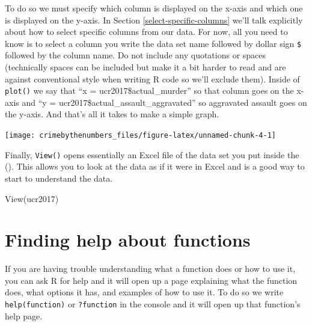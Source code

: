 \documentclass[
  12pt,
]{book}
\newenvironment{Shaded}{\begin{snugshade}}{\end{snugshade}}
\newcommand{\AttributeTok}[1]{\textcolor[rgb]{0.61,0.61,0.61}{#1}}
\newcommand{\FunctionTok}[1]{\textcolor[rgb]{0,0,0}{#1}}
\newcommand{\NormalTok}[1]{#1}
\newcommand{\SpecialCharTok}[1]{\textcolor[rgb]{0,0,0}{#1}}
\begin{document}
To do so we must specify which column is displayed on the x-axis and which one is displayed on the y-axis. In Section \ref{select-specific-columns} we'll talk explicitly about how to select specific columns from our data. For now, all you need to know is to select a column you write the data set name followed by dollar sign \texttt{\$} followed by the column name. Do not include any quotations or spaces (technically spaces can be included but make it a bit harder to read and are against conventional style when writing R code so we'll exclude them). Inside of \texttt{plot()} we say that ``x = ucr2017\$actual\_murder'' so that column goes on the x-axis and ``y = ucr2017\$actual\_assault\_aggravated'' so aggravated assault goes on the y-axis. And that's all it takes to make a simple graph.

\begin{Shaded}
\end{Shaded}

\begin{center}\texttt{[image: crimebythenumbers\_files/figure-latex/unnamed-chunk-4-1]} \end{center}

Finally, \texttt{View()} opens essentially an Excel file of the data set you put inside the (). This allows you to look at the data as if it were in Excel and is a good way to start to understand the data.

\begin{Shaded}
\begin{Highlighting}[]
\FunctionTok{View}\NormalTok{(ucr2017)}
\end{Highlighting}
\end{Shaded}

\hypertarget{finding-help-about-functions}{%
\section{Finding help about functions}\label{finding-help-about-functions}}

If you are having trouble understanding what a function does or how to use it, you can ask R for help and it will open up a page explaining what the function does, what options it has, and examples of how to use it. To do so we write \texttt{help(function)} or \texttt{?function} in the console and it will open up that function's help page.
\end{document}

